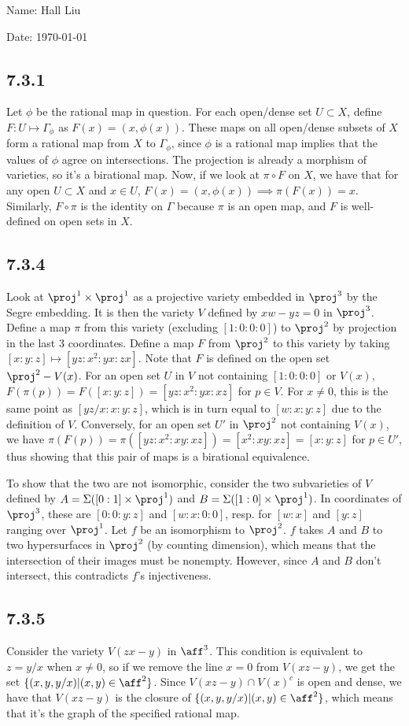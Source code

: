 \documentclass{article}
\begin{document}
Name: Hall Liu

Date: \today 
\vspace{1.5cm}
\subsection*{7.3.1}
Let $\phi$ be the rational map in question. For each open/dense set $U\subset X$, define $F:U\mapsto \Gamma_\phi$ as $F(x)=(x,\phi(x))$. These maps on all open/dense subsets of $X$ form a rational map from $X$ to $\Gamma_\phi$, since $\phi$ is a rational map implies that the values of $\phi$ agree on intersections. The projection is already a morphism of varieties, so it's a birational map. Now, if we look at $\pi\circ F$ on $X$, we have that for any open $U\subset X$ and $x\in U$, $F(x)=(x,\phi(x))\implies \pi(F(x))=x$. Similarly, $F\circ \pi$ is the identity on $\Gamma$ because $\pi$ is an open map, and $F$ is well-defined on open sets in $X$.
\subsection*{7.3.4}
Look at $\proj^1\times\proj^1$ as a projective variety embedded in $\proj^3$ by the Segre embedding. It is then the variety $V$ defined by $xw-yz=0$ in $\proj^3$. Define a map $\pi$ from this variety (excluding $[1:0:0:0]$) to $\proj^2$ by projection in the last $3$ coordinates. Define a map $F$ from $\proj^2$ to this variety by taking $[x:y:z]\mapsto[yz:x^2:yx:zx]$. Note that $F$ is defined on the open set $\proj^2-V(x)$. For an open set $U$ in $V$ not containing $[1:0:0:0]$ or $V(x)$, $F(\pi(p))=F([x:y:z])=[yz:x^2:yx:xz]$ for $p\in V$. For $x\neq0$, this is the same point as $[yz/x:x:y:z]$, which is in turn equal to $[w:x:y:z]$ due to the definition of $V$. Conversely, for an open set $U'$ in $\proj^2$ not containing $V(x)$, we have $\pi(F(p))=\pi([yz:x^2:xy:xz])=[x^2:xy:xz]=[x:y:z]$ for $p\in U'$, thus showing that this pair of maps is a birational equivalence.

To show that the two are not isomorphic, consider the two subvarieties of $V$ defined by $A=\Sigma([0:1]\times\proj^1)$ and $B=\Sigma([1:0]\times\proj^1)$. In coordinates of $\proj^3$, these are $[0:0:y:z]$ and $[w:x:0:0]$, resp. for $[w:x]$ and $[y:z]$ ranging over $\proj^1$. Let $f$ be an isomorphism to $\proj^2$. $f$ takes $A$ and $B$ to two hypersurfaces in $\proj^2$ (by counting dimension), which means that the intersection of their images must be nonempty. However, since $A$ and $B$ don't intersect, this contradicts $f$'s injectiveness.
\subsection*{7.3.5}
Consider the variety $V(zx-y)$ in $\aff^3$. This condition is equivalent to $z=y/x$ when $x\neq0$, so if we remove the line $x=0$ from $V(xz-y)$, we get the set $\{(x,y,y/x)|(x,y)\in\aff^2\}$. Since $V(xz-y)\cap V(x)^c$ is open and dense, we have that $V(xz-y)$ is the closure of $\{(x,y,y/x)|(x,y)\in\aff^2\}$, which means that it's the graph of the specified rational map.
\end{document}
